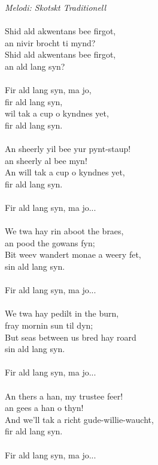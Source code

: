 {\footnotesize\textit{Melodi: Skotskt Traditionell}}\\
\\
Shid ald akwentans bee firgot,\\
an nivir brocht ti mynd?\\
Shid ald akwentans bee firgot,\\
an ald lang syn?\\
\\
Fir ald lang syn, ma jo,\\
fir ald lang syn,\\
wil tak a cup o kyndnes yet,\\
fir ald lang syn.\\
\\
An sheerly yil bee yur pynt-staup!\\
an sheerly al bee myn!\\
An will tak a cup o kyndnes yet,\\
fir ald lang syn.\\
\\
Fir ald lang syn, ma jo...\\
\\
We twa hay rin aboot the braes,\\
an pood the gowans fyn;\\
Bit weev wandert monae a weery fet,\\
sin ald lang syn.\\
\\
Fir ald lang syn, ma jo...\\
\\
We twa hay pedilt in the burn,\\
fray mornin sun til dyn;\\
But seas between us bred hay roard\\
sin ald lang syn.\\
\\
Fir ald lang syn, ma jo...\\
\\
An thers a han, my trustee feer!\\
an gees a han o thyn!\\
And we'll tak a richt gude-willie-waucht,\\
fir ald lang syn.\\
\\
Fir ald lang syn, ma jo...
